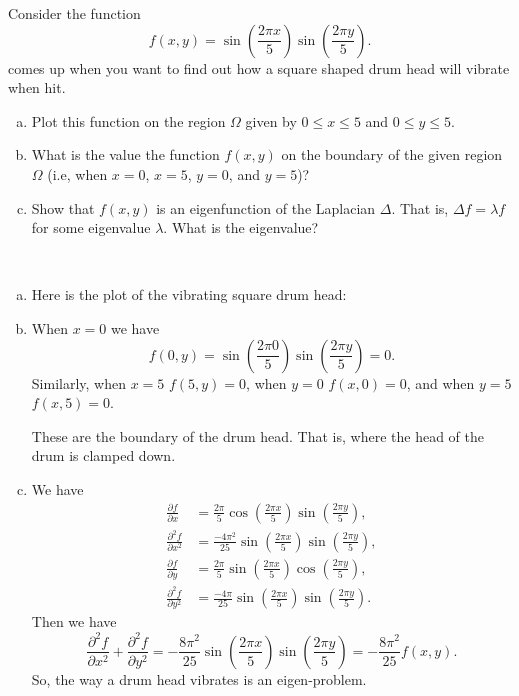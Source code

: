 \documentclass[12pt]{article} %
\begin{document}
\newpage
\begin{problem}
Consider the function
\[
f(x,y)=\sin\left(\frac{2\pi x}{5}\right)\sin\left(\frac{2\pi y}{5}\right).
\]
comes up when you want to find out how a square shaped drum head will vibrate when hit. 
\begin{enumerate}[(a)]
    \item Plot this function on the region $\Omega$ given by $0\leq x \leq 5$ and $0\leq y \leq 5$.  
    \item What is the value the function $f(x,y)$ on the boundary of the given region $\Omega$ (i.e, when $x=0$, $x=5$, $y=0$, and $y=5$)?
    \item Show that $f(x,y)$ is an eigenfunction of the Laplacian $\Delta$. That is, $\Delta f = \lambda f$ for some eigenvalue $\lambda$. What is the eigenvalue?
\end{enumerate}
\end{problem}
\begin{solution}~
\begin{enumerate}[(a)]
    \item Here is the plot of the vibrating square drum head:
    \begin{figure}[H]
        \centering
	\def\svgwidth{0.75\columnwidth}
	
    \end{figure}
    \item When $x=0$ we have
    \[
    f(0,y) = \sin\left( \frac{2\pi 0}{5}\right) \sin\left(\frac{2\pi y}{5}\right) = 0.
    \]
    Similarly, when $x=5$ $f(5,y)=0$, when $y=0$ $f(x,0)=0$, and when $y=5$ $f(x,5)=0$. 
    
    These are the boundary of the drum head.  That is, where the head of the drum is clamped down.
    
    \item We have
    \begin{align*}
        \frac{\partial f}{\partial x} &= \frac{2\pi}{5} \cos \left( \frac{2\pi x}{5} \right) \sin \left( \frac{2\pi y}{5} \right),\\
        \frac{\partial^2 f}{\partial x^2} &= \frac{-4\pi^2}{25} \sin \left( \frac{2\pi x}{5} \right) \sin \left( \frac{2\pi y}{5} \right),\\
        \frac{\partial f}{\partial y} &= \frac{2\pi}{5} \sin \left( \frac{2\pi x}{5} \right) \cos \left( \frac{2\pi y}{5} \right),\\
        \frac{\partial^2 f}{\partial y^2} &= \frac{-4\pi}{25} \sin \left( \frac{2\pi x}{5} \right) \sin \left( \frac{2\pi y}{5} \right).
    \end{align*}
    Then we have
    \[
    \frac{\partial^2 f}{\partial x^2} + \frac{\partial^2 f}{\partial y^2} = -\frac{8\pi^2}{25} \sin \left( \frac{2\pi x}{5} \right) \sin \left( \frac{2\pi y}{5} \right) = -\frac{8\pi^2}{25} f(x,y).
    \]
    So, the way a drum head vibrates is an eigen-problem.
\end{enumerate}
\end{solution}
\end{document}
